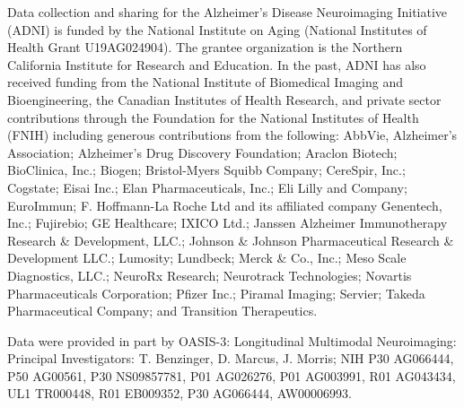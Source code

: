 \documentclass[conference]{IEEEtran}
\begin{document}
Data collection and sharing for the Alzheimer's Disease Neuroimaging Initiative (ADNI) is funded by the National Institute on Aging (National Institutes of Health Grant U19AG024904). The grantee organization is the Northern California Institute for Research and Education. In the past, ADNI has also received funding from the National Institute of Biomedical Imaging and Bioengineering, the Canadian Institutes of Health Research, and private sector contributions through the Foundation for the National Institutes of Health (FNIH) including generous contributions from the following: AbbVie, Alzheimer's Association; Alzheimer's Drug Discovery Foundation; Araclon Biotech; BioClinica, Inc.; Biogen; Bristol-Myers Squibb Company; CereSpir, Inc.; Cogstate; Eisai Inc.; Elan Pharmaceuticals, Inc.; Eli Lilly and Company; EuroImmun; F. Hoffmann-La Roche Ltd and its affiliated company Genentech, Inc.; Fujirebio; GE Healthcare; IXICO Ltd.; Janssen Alzheimer Immunotherapy Research \& Development, LLC.; Johnson \& Johnson Pharmaceutical Research \& Development LLC.; Lumosity; Lundbeck; Merck \& Co., Inc.; Meso Scale Diagnostics, LLC.; NeuroRx Research; Neurotrack Technologies; Novartis Pharmaceuticals Corporation; Pfizer Inc.; Piramal Imaging; Servier; Takeda Pharmaceutical Company; and Transition Therapeutics.

Data were provided in part by OASIS-3: Longitudinal Multimodal Neuroimaging: Principal Investigators: T. Benzinger, D. Marcus, J. Morris; NIH P30 AG066444, P50 AG00561, P30 NS09857781, P01 AG026276, P01 AG003991, R01 AG043434, UL1 TR000448, R01 EB009352, P30 AG066444, AW00006993.
\end{document}
